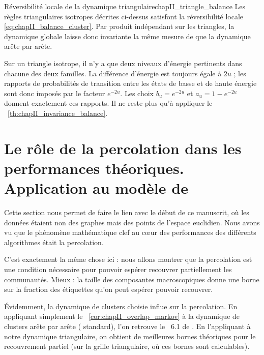 \begin{Fait}{Réversibilité locale de la dynamique triangulaire}{chapII_triangle_balance}
Les règles triangulaires isotropes décrites ci-dessus satisfont la réversibilité locale \eqref{eq:chapII_balance_cluster}. Par produit indépendant sur les triangles, la dynamique globale laisse donc invariante la même mesure de  que la dynamique arête par arête.
\end{Fait}

\begin{Preuve}
Sur un triangle isotrope, il n'y a que deux niveaux d'énergie pertinents dans chacune des deux familles. La différence d'énergie est toujours égale à $2u$ ; les rapports de probabilités de transition entre les états de basse et de haute énergie sont donc imposés par le facteur $e^{-2u}$. Les choix $b_u=e^{-2u}$ et $a_u=1-e^{-2u}$ donnent exactement ces rapports. Il ne reste plus qu'à appliquer le \Th~\ref{th:chapII_invariance_balance}.
\end{Preuve}




\section{Le rôle de la percolation dans les performances théoriques. Application au modèle de \SB{}}

\label{sec:chapII_partie_applications}

Cette section nous permet de faire le lien avec le début de ce manuscrit, où les données étaient non des graphes mais des points de l'espace euclidien.
Nous avons vu que le phénomène mathématique clef au cœur des performances des différents algorithmes était la percolation.

C'est exactement la même chose ici : nous allons montrer que la percolation est une condition nécessaire pour pouvoir espérer recouvrer partiellement les communautés.
Mieux : la taille des composantes macroscopiques donne une borne sur la fraction des étiquettes qu'on peut espérer pouvoir recouvrer.

Évidemment, la dynamique de clusters choisie influe sur la percolation.
En appliquant simplement le \Cor~\ref{cor:chapII_overlap_markov} à la dynamique de clusters arête par arête (\SW{} standard), l'on retrouve le \Th~6.1 de \SB{} \cite{SankararamanBaccelli2018}. En l'appliquant à notre dynamique triangulaire, on obtient de meilleures bornes théoriques pour le recouvrement partiel (sur la grille triangulaire, où ces bornes sont calculables).

